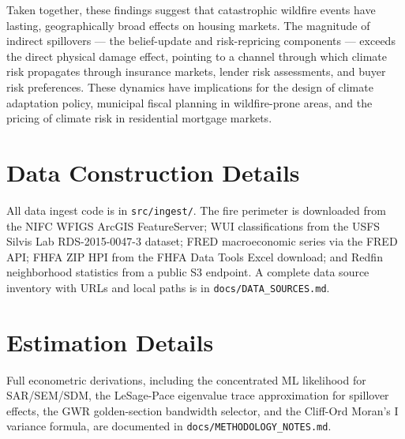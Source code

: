 \documentclass[12pt]{article}
\begin{document}
Taken together, these findings suggest that catastrophic wildfire events have
lasting, geographically broad effects on housing markets. The magnitude of
indirect spillovers --- the belief-update and risk-repricing components ---
exceeds the direct physical damage effect, pointing to a channel through which
climate risk propagates through insurance markets, lender risk assessments, and
buyer risk preferences. These dynamics have implications for the design of
climate adaptation policy, municipal fiscal planning in wildfire-prone areas,
and the pricing of climate risk in residential mortgage markets.

\appendix

\section{Data Construction Details}

All data ingest code is in \texttt{src/ingest/}. The fire perimeter is downloaded
from the NIFC WFIGS ArcGIS FeatureServer; WUI classifications from the USFS Silvis
Lab RDS-2015-0047-3 dataset; FRED macroeconomic series via the FRED API; FHFA ZIP
HPI from the FHFA Data Tools Excel download; and Redfin neighborhood statistics
from a public S3 endpoint. A complete data source inventory with URLs and local
paths is in \texttt{docs/DATA\_SOURCES.md}.

\section{Estimation Details}

Full econometric derivations, including the concentrated ML likelihood for
SAR/SEM/SDM, the LeSage-Pace eigenvalue trace approximation for spillover effects,
the GWR golden-section bandwidth selector, and the Cliff-Ord Moran's I variance
formula, are documented in \texttt{docs/METHODOLOGY\_NOTES.md}.


\end{document}
